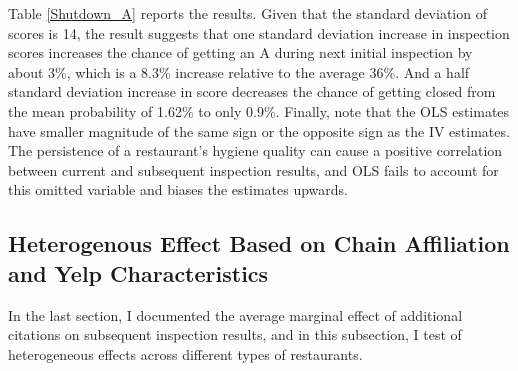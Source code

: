 \documentclass[12pt]{article}
\begin{document}

Table \ref{Shutdown_A} reports the results. Given that the standard deviation of scores is 14, the result suggests that one standard deviation increase in inspection scores increases the chance of getting an A during next initial inspection by about 3\%, which is a 8.3\% increase relative to the average 36\%. And a half standard deviation increase in score decreases the chance of getting closed from the mean probability of 1.62\% to only 0.9\%. Finally, note that the OLS estimates have smaller magnitude of the same sign or the opposite sign as the IV estimates. The persistence of a restaurant's hygiene quality can cause a positive correlation between current and subsequent inspection results, and OLS fails to account for this omitted variable and biases the estimates upwards. 

\subsection{Heterogenous Effect Based on Chain Affiliation and Yelp Characteristics }

In the last section, I documented the average marginal effect of additional citations on subsequent inspection results, and in this subsection, I test of heterogeneous effects across different types of restaurants. 
\end{document}
